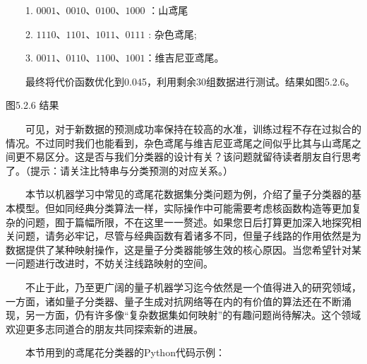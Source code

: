 \documentclass[a4paper,11pt,english]{sphinxmanual}
\let\sphinxpxdimen\pdfpxdimen\else\newdimen\sphinxpxdimen
\begin{document}
\sphinxAtStartPar
  1.  \(0001、0010、0100、1000\) ：山鸢尾

\sphinxAtStartPar
  2.  \(1110、1101、1011、0111\) : 杂色鸢尾;

\sphinxAtStartPar
  3.  \(0011、0110、1100、1001\)：维吉尼亚鸢尾。

\sphinxAtStartPar
  最终将代价函数优化到0.045，利用剩余30组数据进行测试。结果如图5.2.6。

\noindent{\hspace*{\fill}\sphinxincludegraphics[width=350\sphinxpxdimen]{{5.2.6}.png}\hspace*{\fill}}

\begin{center}图5.2.6 结果
\end{center}
\sphinxAtStartPar
  可见，对于新数据的预测成功率保持在较高的水准，训练过程不存在过拟合的情况。不过同时我们也能看到，杂色鸢尾与维吉尼亚鸢尾之间似乎比其与山鸢尾之间更不易区分。这是否与我们分类器的设计有关？该问题就留待读者朋友自行思考了。（提示：请关注比特串与分类预测的对应关系。）

\sphinxAtStartPar
  本节以机器学习中常见的鸢尾花数据集分类问题为例，介绍了量子分类器的基本模型。但如同经典分类算法一样，实际操作中可能需要考虑核函数构造等更加复杂的问题，囿于篇幅所限，不在这里一一赘述。如果您日后打算更加深入地探究相关问题，请务必牢记，尽管与经典函数有着诸多不同，但量子线路的作用依然是为数据提供了某种映射操作，这是量子分类器能够生效的核心原因。当您希望针对某一问题进行改进时，不妨关注线路映射的空间。

\sphinxAtStartPar
  不止于此，乃至更广阔的量子机器学习迄今依然是一个值得进入的研究领域，一方面，诸如量子分类器、量子生成对抗网络等在内的有价值的算法还在不断涌现，另一方面，仍有许多像“复杂数据集如何映射”的有趣问题尚待解决。这个领域欢迎更多志同道合的朋友共同探索新的进展。

\sphinxAtStartPar
  本节用到的鸢尾花分类器的Python代码示例：
\end{document}
